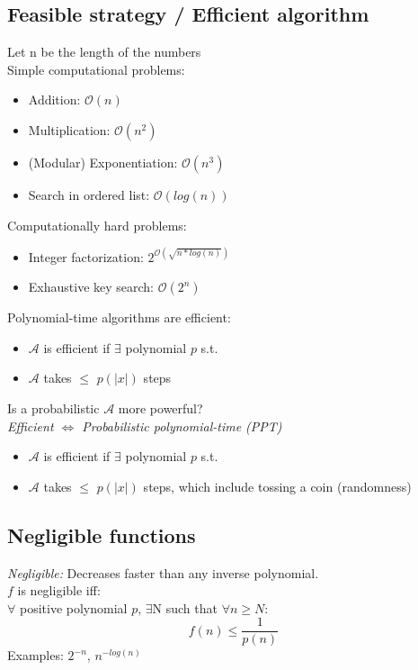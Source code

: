 \documentclass[12pt]{article}
\begin{document}
\subsection{Feasible strategy / Efficient algorithm}
Let n be the length of the numbers\\
Simple computational problems:
\begin{itemize}
\item Addition: $\mathcal{O}(n)$
\item Multiplication: $\mathcal{O}(n^2)$
\item (Modular) Exponentiation: $\mathcal{O}(n^3)$
\item Search in ordered list: $\mathcal{O}(log(n))$
\end{itemize}
Computationally hard problems:
\begin{itemize}
\item Integer factorization: $2^{\mathcal{O}(\sqrt{n*log(n)})}$
\item Exhaustive key search: $\mathcal{O}(2^n)$
\end{itemize}
\newpage
Polynomial-time algorithms are efficient:
\begin{itemize}
\item $\mathcal{A}$ is efficient if $\exists$ polynomial $p$ s.t.
\item $\mathcal{A}$ takes $\le$ $p(|x|)$ steps
\end{itemize}
Is a probabilistic $\mathcal{A}$ more powerful?\\
\emph{Efficient $\iff$ Probabilistic polynomial-time (PPT)}
\begin{itemize}
\item $\mathcal{A}$ is efficient if $\exists$ polynomial $p$ s.t.
\item $\mathcal{A}$ takes $\le$ $p(|x|)$ steps, which include tossing a coin (randomness)
\end{itemize}
\subsection{Negligible functions}
\emph{Negligible:} Decreases faster than any inverse polynomial.\\
$f$ is negligible iff:\\
$\forall$ positive polynomial $p$, $\exists$N such that $\forall n\ge N$:\\
\begin{equation}
f(n) \le \frac{1}{p(n)}
\end{equation}
Examples: $2^{-n}$, $n^{-log(n)}$
\end{document}
